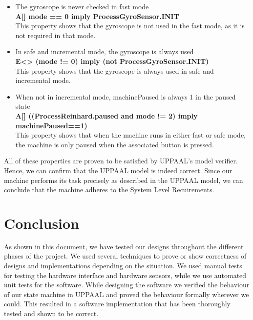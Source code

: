\documentclass[a4paper,oneside,11pt]{article}
\begin{document}
\begin{itemize}
	\item The gyroscope is never checked in fast mode\\
		\textbf{A[] mode == 0 imply ProcessGyroSensor.INIT}\\
		This property shows that the gyroscope is not used in the fast mode, as it is not required in that mode. 

	\item In safe and incremental mode, the gyroscope is always used\\
		\textbf{E<> (mode != 0) imply (not ProcessGyroSensor.INIT)}\\
		This property shows that the gyroscope is always used in safe and incremental mode. 

	\item When not in incremental mode, machinePaused is always 1 in the paused state\\
		\textbf{A[] ((ProcessReinhard.paused and mode != 2) imply machinePaused==1)}\\
		This property shows that when the machine runs in either fast or safe mode, the machine is only paused when the associated button is pressed.
\end{itemize}

All of these properties are proven to be satisfied by UPPAAL’s model verifier. Hence, we can confirm that the UPPAAL model is indeed correct. Since our machine performs its task precisely as described in the UPPAAL model, we can conclude that the machine adheres to the System Level Recuirements.

\section{Conclusion}
As shown in this document, we have tested our designs throughout the different phases of the project. We used several techniques to prove or show correctness of designs and implementations depending on the situation. We used manual tests for testing the hardware interface and hardware sensors, while we use automated unit tests for the software. While designing the software we verified the behaviour of our state machine in UPPAAL and proved the behaviour formally wherever we could. This resulted in a software implementation that has been thoroughly tested and shown to be correct.
\end{document}
